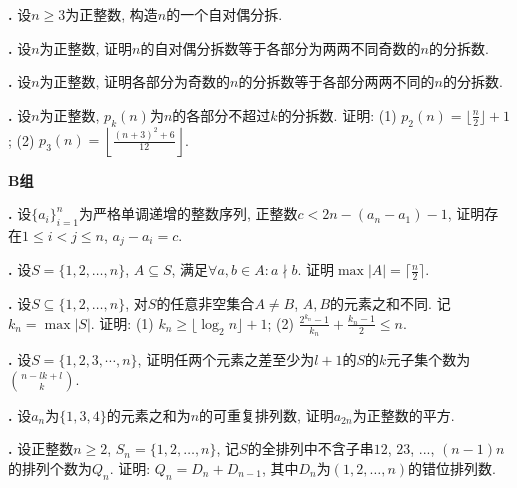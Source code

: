 \par \textbf{\theprobenum .} \cite{IC} 设$n\ge 3$为正整数, 构造$n$的一个自对偶分拆.

\par \textbf{\theprobenum .} \cite{IC} 设$n$为正整数, 证明$n$的自对偶分拆数等于各部分为两两不同奇数的$n$的分拆数.

\par \textbf{\theprobenum .} \cite{IC} 设$n$为正整数, 证明各部分为奇数的$n$的分拆数等于各部分两两不同的$n$的分拆数.

\par \textbf{\theprobenum .} \cite{IC} 设$n$为正整数, $p_k(n)$为$n$的各部分不超过$k$的分拆数. 证明: (1) $p_2(n)= \lfloor \frac{n}{2}\rfloor+1$; (2) $p_3(n)= \left\lfloor \frac{(n+3)^2+6}{12}\right\rfloor$.

\par \textbf{B组}

\par \textbf{\theprobenum .} \cite{IC} 设$\{a_i\}_{i=1}^n$为严格单调递增的整数序列, 正整数$c<2n-(a_n-a_1)-1$, 证明存在$1\le i<j \le n$, $a_j-a_i=c$. 

\par \textbf{\theprobenum .} 设$S=\{1,2,\dots,n\}$, $A\subseteq S$, 满足$\forall a,b\in A: a\nmid b$. 证明$\max |A|=\lceil \frac{n}{2}\rceil$. 

\par \textbf{\theprobenum .} 设$S\subseteq \{1,2,\dots, n\}$, 对$S$的任意非空集合$A\neq B$, $A,B$的元素之和不同. 记$k_n=\max |S|$. 证明: (1) $k_n\ge \lfloor \log_2 n \rfloor+1$; (2) $\frac{2^{k_n}-1}{k_n}+\frac{k_n-1}{2}\le n$. 

\par \textbf{\theprobenum .} \cite{IC} 设$S=\{1,2,3,\cdots,n\}$, 证明任两个元素之差至少为$l+1$的$S$的$k$元子集个数为$\binom{n-lk+l}{k}$.

\par \textbf{\theprobenum .} \cite{SMI} 设$a_n$为$\{1,3,4\}$的元素之和为$n$的可重复排列数, 证明$a_{2n}$为正整数的平方. 

\par \textbf{\theprobenum .} \cite{IC} 设正整数$n\ge 2$, $S_n=\{1,2,\dots,n\}$, 记$S$的全排列中不含子串$12$, $23$, ..., $(n-1)n$的排列个数为$Q_n$. 证明: $Q_n= D_n + D_{n-1}$, 其中$D_n$为$(1,2,\dots,n)$的错位排列数. 

